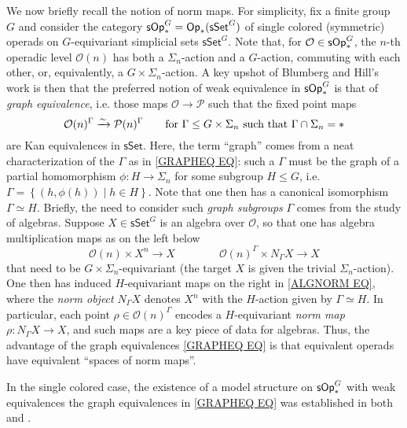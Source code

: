 \documentclass[a4paper,10pt
 ,final
]{article}%
\numberwithin{equation}{section}
\numberwithin{figure}{section}
\theoremstyle{definition} %
\newcommand{\sets}[2]{\left\{ #1 \;|\; #2\right\}}%
\renewcommand{\O}{\ensuremath{\mathcal O}}
\newcommand{\1}{\ensuremath{\mathbbm 1}}%
\begin{document}
We now briefly recall 
the notion of norm maps.
For simplicity,
fix a finite group $G$
and consider the category
$\mathsf{sOp}^{G}_{\**} = \mathsf{Op}_{\**}(\mathsf{sSet}^G)$
of single colored (symmetric) operads
on $G$-equivariant simplicial sets $\mathsf{sSet}^G$.
Note that, for $\O \in \mathsf{sOp}^{G}_{\**}$,
the $n$-th operadic level $\O(n)$ has both a $\Sigma_n$-action and a $G$-action, commuting with each other, or, equivalently, 
a $G \times \Sigma_n$-action.
A key upshot
of Blumberg and Hill's work \cite{BH15}
is then that 
the preferred notion of weak equivalence in $\mathsf{sOp}^{G}_{\**}$
is that of \emph{graph equivalence},
i.e. those maps 
$\O \to \mathcal{P}$
such that the fixed point maps
\begin{equation}\label{GRAPHEQ EQ}
\O(n)^{\Gamma} \xrightarrow{\sim} \mathcal{P}(n)^{\Gamma}
\qquad
\text{for }
\Gamma \leq G \times \Sigma_n
\text{ such that }
\Gamma \cap \Sigma_n = \**
\end{equation}
are Kan equivalences in $\mathsf{sSet}$.
%
Here, the term ``graph'' comes from a neat characterization of the $\Gamma$
as in \eqref{GRAPHEQ EQ}:
such a $\Gamma$ must be the graph of a partial homomorphism
$\phi \colon H \to \Sigma_n$ for some subgroup $H \leq G$,
i.e.
$\Gamma = \sets{(h,\phi(h))}{h \in H}$. 
Note that one then has a canonical isomorphism $\Gamma \simeq H$.
%
Briefly, the need to consider such \emph{graph subgroups} $\Gamma$ comes from the study of algebras.
Suppose $X \in \mathsf{sSet}^G$ is an algebra over
$\O$,
so that one has algebra multiplication maps
as on the left below
\begin{equation}\label{ALGNORM EQ}
\O(n) \times X^n \to X
\qquad \qquad
\O(n)^{\Gamma} \times N_{\Gamma}X \to X
\end{equation}
that need to be 
$G \times \Sigma_n$-equivariant
(the target $X$ is given the trivial $\Sigma_n$-action).
One then has induced 
$H$-equivariant maps 
on the right in \eqref{ALGNORM EQ},
where the \emph{norm object} $N_{\Gamma} X$
denotes $X^{n}$ with the $H$-action given by $\Gamma \simeq H$.
In particular, each point
$\rho \in \O(n)^{\Gamma}$
encodes a $H$-equivariant \emph{norm map}
$\rho \colon N_{\Gamma} X \to X$,  
and such maps are a key piece of data
for algebras. %
Thus, the advantage of the graph equivalences \eqref{GRAPHEQ EQ}
is that equivalent operads have
equivalent ``spaces of norm maps''.


In the single colored case,
the existence of a model structure 
on $\mathsf{sOp}^G_{\**}$
with weak equivalences the graph equivalences
in \eqref{GRAPHEQ EQ}
was established in both 
\cite[Thm. I]{BP_geo} and \cite[Thm. 3.1]{GW18}.
\end{document}
